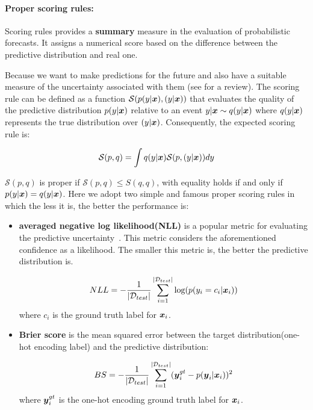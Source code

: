 \paragraph{Proper scoring rules:} 
Scoring rules provides a \textbf{summary} measure in the evaluation of probabilistic forecasts.
It assigns a numerical score based on the difference between the predictive distribution and real one. 

Because we want to make predictions for the future and also have a suitable measure of the uncertainty associated with them (see \cite{gneiting2007strictly} for a review). 
The scoring rule can be defined as a function $\mathcal S(p(y|\boldsymbol x), (y|\boldsymbol x))$ that evaluates the quality of the predictive distribution $p(y|\boldsymbol x)$ relative to an event $y|\boldsymbol x \sim q(y|\boldsymbol x)$ where $q(y|\boldsymbol x)$ represents the true distribution over $(y|\boldsymbol x)$.
Consequently, the expected scoring rule is:

\begin{equation}\label{scoring rule}
	\mathcal S(p, q) = \int q(y| \boldsymbol x) \mathcal S(p,(y|\boldsymbol x))dy
\end{equation}

$\mathcal S(p,q)$ is proper if $\mathcal S(p,q) \leq S(q,q)$, with equality holds if and only if $p(y|\boldsymbol x) = q(y|\boldsymbol x)$. Here we adopt two simple and famous proper scoring rules in which the less it is, the better the performance is:
\begin{itemize}
	\item \textbf{averaged negative log likelihood(NLL)} is a popular metric for evaluating the predictive uncertainty~\cite{quinonero2005evaluating}.
	This metric considers the aforementioned confidence as a likelihood.
	The smaller this metric is, the better the predictive distribution is.
	
	\begin{equation} \label{nll}
		NLL = -\frac{1}{|\mathcal D_{test}|}\sum_{i=1}^{|\mathcal D_{test}|}\text{log}(p(y_i = c_i|\boldsymbol x_i))
	\end{equation}
	where $c_i$ is the ground truth label for $\boldsymbol x_i$.	
	\item \textbf{Brier score} is the mean squared error between the target distribution(one-hot encoding label) and the predictive distribution:
	
	\begin{equation} \label{bs}
	BS = -\frac{1}{|\mathcal D_{test}|}\sum_{i=1}^{|\mathcal D_{test}|}(\boldsymbol y^{gt}_i - p(\boldsymbol y_i|\boldsymbol x_i))^2
	\end{equation}
	where $\boldsymbol y^{gt}_i$ is the one-hot encoding ground truth label for $\boldsymbol x_i$. 
	
\end{itemize}

